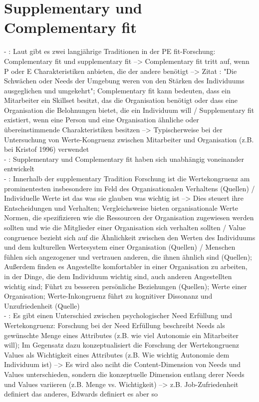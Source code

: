 \section{Supplementary und Complementary fit}
\label{ch:personEnvironmentFit:supplementaryUndComplementary}
- \cite[S. 1]{edwards:2004}: Laut \textcite{muchinsky:1987} gibt es zwei langjährige Traditionen in der PE fit-Forschung: Complementary fit und supplementary fit --> Complementary fit tritt auf, wenn P oder E Charakteristiken anbieten, die der andere benötigt --> Zitat \cite{muchinsky:1987}: "Die Schwächen oder Needs der Umgebung weren von den Stärken des Individuums ausgeglichen und umgekehrt"; Complementary fit kann bedeuten, dass ein Mitarbeiter ein Skillset besitzt, das die Organisation benötigt oder dass eine Organisation die Belohnungen bietet, die ein Individuum will / Supplementary fit existiert, wenn eine Person und eine Organisation ähnliche oder übereinstimmende Charakteristiken besitzen --> Typischerweise bei der Untersuchung von Werte-Kongruenz zwischen Mitarbeiter und Organisation (z.B. bei Kristof 1996) verwendet \\
- \cite[S. 1]{edwards:2004}: Supplementary und Complementary fit haben sich unabhängig voneinander entwickelt \\
- \cite[S. 2]{edwards:2004}: Innerhalb der supplementary Tradition Forschung ist die Wertekongruenz am prominentesten insbesondere im Feld des Organisationalen Verhaltens (Quellen) / Individuelle Werte ist das was sie glauben was wichtig ist --> Dies steuert ihre Entscheidungen und Verhalten; Vergleichsweise bieten organisationale Werte Normen, die spezifizieren wie die Ressourcen der Organisation zugewiesen werden sollten und wie die Mitglieder einer Organisation sich verhalten sollten / Value congruence bezieht sich auf die Ähnlichkeit zwischen den Werten des Individuums und dem kulturellen Wertesystem einer Organisation (Quellen) / Menschen fühlen sich angezogener und vertrauen anderen, die ihnen ähnlich sind (Quellen); Außerdem finden es Angestellte komfortabler in einer Organisation zu arbeiten, in der Dinge, die dem Individuum wichtig sind, auch anderen Angestellten wichtig sind; Führt zu besseren persönliche Beziehungen (Quellen); Werte einer Organisation; Werte-Inkongruenz führt zu kognitiver Dissonanz und Unzufriedenheit (Quelle) \\
- \cite[S. 2]{edwards:2004}: Es gibt einen Unterschied zwischen psychologischer Need Erfüllung und Wertekongruenz: Forschung bei der Need Erfüllung beschreibt Needs als gewünschte Menge eines Attributes (z.B. wie viel Autonomie ein Mitarbeiter will); Im Gegensatz dazu konzeptualisiert die Forschung der Wertekongruenz Values als Wichtigkeit eines Attributes (z.B. Wie wichtig Autonomie dem Individuum ist) --> Es wird also nciht die Content-Dimension von Needs und Values unterschieden, sondern die konzeptuelle Dimension entlang derer Needs und Values variieren (z.B. Menge vs. Wichtigkeit) --> z.B. Job-Zufriedenheit definiert das anderes, Edwards definiert es aber so \\
